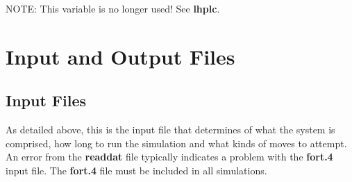 \documentclass[12pt,letterpaper]{article}
\begin{document}
{{{{{{ NOTE: This variable is no longer used! See {\textbf{lhplc}}.

\section{Input and Output Files}

\subsection{Input Files}

As detailed above, this is the input file that determines of what the system is comprised, how long to run the simulation and what kinds of moves to attempt.  An error from the {\textbf{readdat}} file typically indicates a problem with the {\textbf{fort.4}} input file.
The {\textbf{fort.4}} file must be included in all simulations.  

}}}}}}
\end{document}

